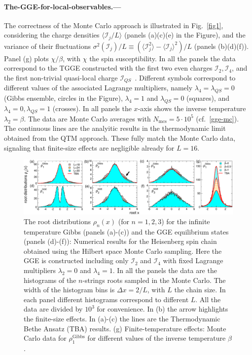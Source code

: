 \documentclass[twocolumn,superscriptaddress,prb,10pt]{revtex4-1}
\begin{document}
\paragraph*{The-GGE-for-local-observables.---} 

The correctness of the Monte Carlo approach is illustrated in Fig.~\ref{fig1}, considering 
the charge densities $\langle {\mathcal I}_j/L\rangle$ (panels (a)(c)(e) in the Figure), 
and the variance of their fluctuations $\sigma^2({\mathcal I}_j)/L\equiv
(\langle{\mathcal I}_j^2\rangle-\langle{\mathcal I}_j\rangle^2)/L$ (panels (b)(d)(f)). 
Panel (g) plots $\chi/\beta$, with $\chi$ the spin susceptibility. 
In all the panels the data correspond to the TGGE constructed 
with the first two even charges ${\mathcal I}_2,{\mathcal I}_4$, and the first 
non-trivial quasi-local charge ${\mathcal I}_{QS}$~\cite{ilievski-2015,ilievski-2015a}. 
Different symbols correspond to different values of the associated Lagrange multipliers, 
namely $\lambda_4=\lambda_{QS}=0$ (Gibbs ensemble, circles in the Figure), $\lambda_4=1$ and 
$\lambda_{QS}=0$ (squares), and $\lambda_4=0,\lambda_{QS}=1$ (crosses). 
In all panels the $x$-axis shows the inverse temperature $\lambda_2=\beta$. The data 
are Monte Carlo averages with $N_{\textrm{mcs}}=5\cdot 10^5$ (cf.~\eqref{gge-mc}). 
The continuous lines are the analyitic results in the thermodynamic limit obtained from the 
QTM approach. These fully match the Monte 
Carlo data, signaling  that finite-size effects are negligible already for $L=16$.  

\begin{figure}[t]
\includegraphics*[width=0.99\linewidth]{fig3}
\caption{The root distributions $\rho_n(x)$ (for $n=1,2,3$) for the infinite temperature 
 Gibbs (panels (a)-(c)) and the GGE equilibrium states (panels (d)-(f)): Numerical  
 results for the Heisenberg spin chain obtained using the Hilbert space Monte Carlo 
 sampling. Here the GGE is constructed including only ${\mathcal I}_2$ and ${\mathcal I}_4$ 
 with fixed Lagrange multipliers $\lambda_2=0$ and $\lambda_4=1$. In all the panels the 
 data are the histograms of the $n$-strings roots sampled in the Monte Carlo.
 The width of the histogram bins is $\Delta x=2/L$, with $L$ the chain size. 
 In each panel different histograms correspond to different $L$. All the data are divided 
 by $10^3$ for convenience. In (b) the arrow highlights the finite-size effects. In 
 (a)-(c) the lines are the Thermodynamic Bethe Ansatz (TBA) results. (g) Finite-temperature 
 effects: Monte Carlo data for $\rho^{\textrm{Gibbs}}_1$ for different values of the 
 inverse temperature $\beta$.
}
\label{fig3}
\end{figure}
\end{document}
